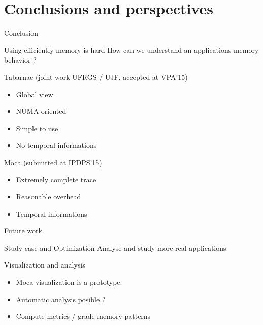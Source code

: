 \documentclass[xcolor={usenames,dvipsnames}]{beamer}
\begin{document}
\section{Conclusions and perspectives}
\begin{frame}{Conclusion}
    \begin{exampleblock}{Using efficiently memory is hard}
        How can we understand an applications memory behavior ?
    \end{exampleblock}
    \pause
    \begin{block}{Tabarnac (joint work UFRGS / UJF, accepted at VPA'15)}
        \begin{itemize}
            \item Global view
            \item NUMA oriented
            \item Simple to use
            \item No temporal informations
        \end{itemize}
    \end{block}
    \pause
    \begin{alertblock}{Moca (submitted at IPDPS'15)}
        \begin{itemize}
            \item Extremely complete trace
            \item Reasonable overhead
            \item Temporal informations
        \end{itemize}
    \end{alertblock}
\end{frame}

\setcounter{finalframe}{\value{framenumber}}

\begin{frame}{Future work}
    \begin{block}{Study case and Optimization}
        Analyse and study more real applications
    \end{block}
    \pause
    \begin{alertblock}{Visualization and analysis}
        \begin{itemize}[<+->]
            \item Moca visualization is a prototype.
            \item Automatic analysis posible ?
            \item Compute metrics / grade memory patterns
        \end{itemize}
    \end{alertblock}
\end{frame}
\end{document}
